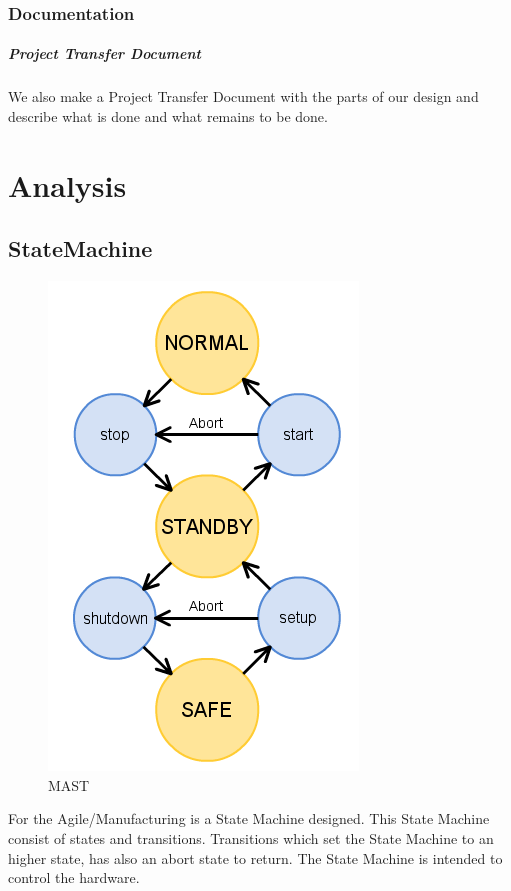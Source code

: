 \documentclass[12pt,a4paper]{report}
\begin{document}
\subsection{Documentation}
\paragraph{Project Transfer Document}We also make a Project Transfer Document with the parts of our design and describe what is done and what remains to be done.

\chapter{Analysis}
\section{StateMachine}
\begin{figure}
	\begin{center}
		\includegraphics[scale=0.5]{pictures/mast.png}
	\caption{MAST}
	\vspace{-100pt}
	\end{center}
\end{figure}
For the Agile/Manufacturing is a State Machine designed. This State Machine consist of states and transitions. Transitions which set the State Machine to an higher state, has also an abort state to return. The State Machine is intended to control the hardware.
\end{document}
